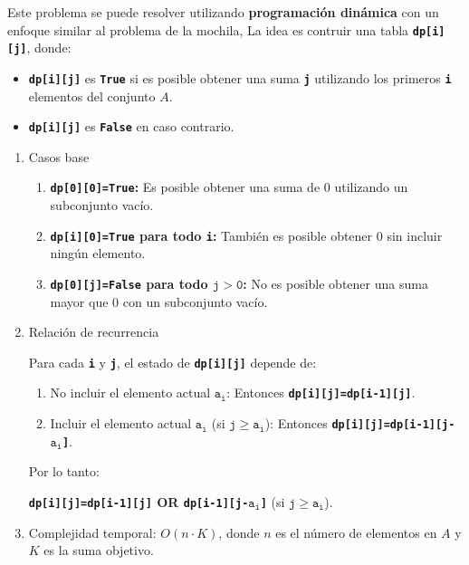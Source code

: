 \begin{enumerate}[label=\color{red}\textbf{\arabic*)}]
\begin{enumerate}[label=\color{red}\textbf{\alph*)}]
      Este problema se puede resolver utilizando \textbf{programación dinámica} con un enfoque similar al problema de la mochila, La idea es contruir una tabla \textbf{\texttt{dp[i][j]}}, donde:
      \begin{itemize}[label=\textbullet]
        \item \textbf{\texttt{dp[i][j]}} es \textbf{\texttt{True}}  si es posible obtener una suma \textbf{\texttt{j}} utilizando los primeros \textbf{\texttt{i}} elementos del conjunto $A$.
        \item \textbf{\texttt{dp[i][j]}} es \textbf{\texttt{False}} en caso contrario.
      \end{itemize}
      \begin{enumerate}[label=\arabic*)]
        \item Casos base
          \begin{enumerate}[label=\arabic*)]
            \item \textbf{\texttt{dp[0][0]=True}:} Es posible obtener una suma de $0$ utilizando un subconjunto vacío.
            \item \textbf{\texttt{dp[i][0]=True} para todo \texttt{i}:} También es posible obtener $0$ sin incluir ningún elemento.
            \item \textbf{\texttt{dp[0][j]=False} para todo $\mathbf{\mathtt{j>0}}$:} No es posible obtener una suma mayor que $0$ con un subconjunto vacío.
          \end{enumerate}
        \item Relación de recurrencia

          Para cada \textbf{\texttt{i}} y \textbf{\texttt{j}}, el estado de \textbf{\texttt{dp[i][j]}} depende de:
          \begin{enumerate}[label=\arabic*)]
            \item No incluir el elemento actual $\mathbf{\mathtt{a_i}}$: Entonces \textbf{\texttt{dp[i][j]=dp[i-1][j]}}.
            \item Incluir el elemento actual $\mathbf{\mathtt{a_i}}$ (si $\mathbf{\mathtt{j\ge a_i}}$): Entonces \textbf{\texttt{dp[i][j]=dp[i-1][j-$\mathbf{\mathtt{a_i}}$]}}.
          \end{enumerate}
          Por lo tanto: 
          \begin{center}
            \textbf{\texttt{dp[i][j]=dp[i-1][j]} OR \texttt{dp[i-1][j-$\mathbf{\mathtt{a_i}}$]} }\quad (si $\mathbf{\mathtt{j\ge  a_i}}$).
          \end{center}
          \item Complejidad temporal: $O(n\cdot K)$, donde $n$ es el número de elementos en $A$ y $K$ es la suma objetivo.


\end{enumerate}
\end{enumerate}
\end{enumerate}
